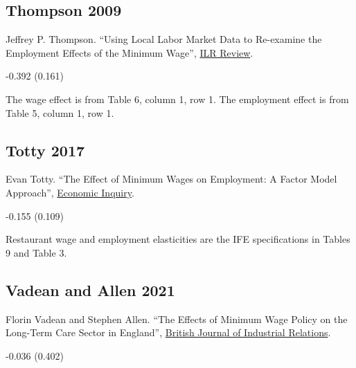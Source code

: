 \subsection*{Thompson 2009}
\vspace{-0.7em}

\noindent Jeffrey P. Thompson. ``Using Local Labor Market Data to Re-examine the Employment Effects of the Minimum Wage'', \href{https://doi.org/10.1177/001979390906200305}{ILR Review}.

\vspace{0.7em}

 -0.392 (0.161)

\vspace{0.7em}

 The wage effect is from Table 6, column 1, row 1. The employment effect is from Table 5, column 1, row 1.

\subsection*{Totty 2017}
\vspace{-0.7em}

\noindent Evan Totty. ``The Effect of Minimum Wages on Employment: A Factor Model Approach'', \href{https://doi.org/10.1111/ecin.12472}{Economic Inquiry}.

\vspace{0.7em}

 -0.155 (0.109)

\vspace{0.7em}

 Restaurant wage and employment elasticities are the IFE specifications in Tables 9 and Table 3.

\subsection*{Vadean and Allen 2021}
\vspace{-0.7em}

\noindent Florin Vadean and Stephen Allen. ``The Effects of Minimum Wage Policy on the Long-Term Care Sector in England'', \href{https://doi.org/10.1111/bjir.12572}{British Journal of Industrial Relations}.

\vspace{0.7em}

 -0.036 (0.402)

